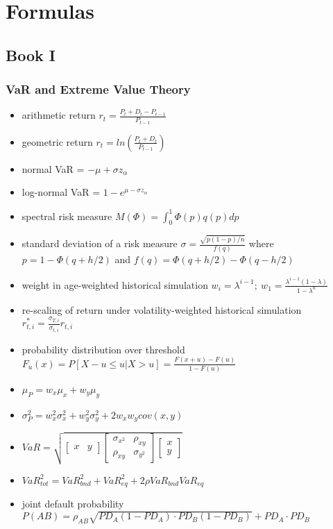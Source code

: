 \chapter{Formulas}

\section{Book I}

\subsection{VaR and Extreme Value Theory}
\begin{itemize}
	\item arithmetic return $r_t = \frac{P_t + D_t - P_{t - 1}}{P_{t - 1}}$
	\item geometric return $r_t = ln \left(\frac{P_t + D_t}{P_{t - 1}}\right)$
	\item normal VaR = $-\mu + \sigma z_{\alpha}$
	\item log-normal VaR = $1 - e^{\mu - \sigma z_{\alpha}}$
	\item spectral risk measure $M(\Phi) = \int_0^1 \Phi(p) q(p) dp$
	\item standard deviation of a risk measure $\sigma = \frac{\sqrt{p(1 - p) / n}}{f(q)}$ where $p = 1 - \Phi(q + h/2)$ and $f(q) = \Phi(q + h/2) - \Phi(q - h/2)$
	\item weight in age-weighted historical simulation $w_i = \lambda^{i - 1}; ~ w_1 = \frac{\lambda^{i - 1}(1 - \lambda)}{1 - \lambda^n}$
	\item re-scaling of return under volatility-weighted historical simulation $r^*_{t,i} = \frac{\sigma_{T,i}}{\sigma_{t,i}}r_{t,i}$
	\item probability distribution over threshold $F_u(x) = P[X - u \le u | X > u] = \frac{F(x + u) - F(u)}{1 - F(u)}$
	\item $\mu_P = w_x \mu_x + w_y \mu_y$
	\item $\sigma_P^2 = w_x^2 \sigma_x^2 + w_y^2 \sigma_y^2 + 2 w_x w_y cov(x, y)$
	\item $VaR = \sqrt{\begin{bmatrix} x & y \end{bmatrix} \begin{bmatrix} \sigma_{x^2} & \rho_{xy}\\ \rho_{xy} & \sigma_{y^2} \end{bmatrix} \begin{bmatrix}x \\ y \end{bmatrix}}$
	\item $VaR_{tot}^2 = VaR_{bnd}^2 + VaR_{eq}^2 + 2 \rho VaR_{bnd} VaR_{eq}$
	\item joint default probability $P(AB) = \rho_{AB} \sqrt{PD_A(1 - PD_A) \cdot PD_B(1 - PD_B)} + PD_A \cdot PD_B$
\end{itemize}

